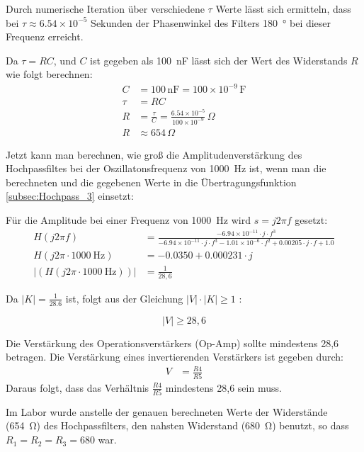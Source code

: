 Durch numerische Iteration über verschiedene \(\tau\) Werte lässt sich ermitteln, dass bei \(\tau \approx 6.54 \times 10^{-5}\) Sekunden der Phasenwinkel des Filters \SI{180}{\degree}  bei dieser Frequenz erreicht.

Da \(\tau = RC\), und \(C\) ist gegeben als \SI{100}{\nano\farad} lässt sich der Wert des Widerstands \(R\) wie folgt berechnen:
\begin{align}
C &= 100 \, \text{nF} = 100 \times 10^{-9} \, \text{F} \\
\tau &= RC \\
R &= \frac{\tau}{C} = \frac{6.54 \times 10^{-5}}{100 \times 10^{-9}} \, \Omega \\
R &\approx 654 \, \Omega
\end{align}

Jetzt kann man berechnen, wie groß die Amplitudenverstärkung des Hochpassfiltes bei der Oszillatonsfrequenz von \SI{1000}{\hertz} ist, wenn man die berechneten und die gegebenen Werte in die Übertragungsfunktion \ref{subsec:Hochpass_3} einsetzt:


Für die Amplitude bei einer Frequenz von \SI{1000}{\hertz} wird  \(s = j2\pi f\) gesetzt:
\begin{align*}
    H(j2\pi f) &= \frac{-6.94 \times 10^{-11} \cdot j \cdot f^3}{-6.94 \times 10^{-11} \cdot j \cdot f^3 - 1.01 \times 10^{-6} \cdot f^2 + 0.00205 \cdot j \cdot f + 1.0} \\
    H(j2\pi \cdot \SI{1000}{\hertz}) &= -0.0350 + 0.000231 \cdot j \\
    |(H(j2\pi \cdot \SI{1000}{\hertz}))| &= \frac{1}{28,6}
\end{align*}

Da $|K| = \frac{1}{28.6}$ ist, folgt aus der Gleichung  $ |V| \cdot |K| \geq 1 $ :

\begin{equation*}
     |V| \geq 28,6
\end{equation*}

Die Verstärkung des Operationsverstärkers (Op-Amp) sollte mindestens 28,6 betragen. Die Verstärkung eines invertierenden Verstärkers ist gegeben durch:
\begin{align*}
    V &= \frac{R4}{R5}
\end{align*}
Daraus folgt, dass das Verhältnis \( \frac{R4}{R5} \) mindestens 28,6 sein muss.

Im Labor wurde anstelle der genauen berechneten Werte der Widerstände (\SI{654}{\ohm}) des Hochpassfilters, den nahsten Widerstand  (\SI{680}{\ohm}) benutzt, so dass
$R_1=R_2=R_3=680$ war. 


